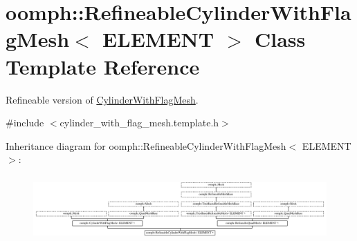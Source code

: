 \hypertarget{classoomph_1_1RefineableCylinderWithFlagMesh}{}\section{oomph\+:\+:Refineable\+Cylinder\+With\+Flag\+Mesh$<$ E\+L\+E\+M\+E\+NT $>$ Class Template Reference}
\label{classoomph_1_1RefineableCylinderWithFlagMesh}


Refineable version of \hyperlink{classoomph_1_1CylinderWithFlagMesh}{Cylinder\+With\+Flag\+Mesh}.  




{\ttfamily \#include $<$cylinder\+\_\+with\+\_\+flag\+\_\+mesh.\+template.\+h$>$}

Inheritance diagram for oomph\+:\+:Refineable\+Cylinder\+With\+Flag\+Mesh$<$ E\+L\+E\+M\+E\+NT $>$\+:\begin{figure}[H]
\begin{center}
\leavevmode
\includegraphics[height=2.522523cm]{classoomph_1_1RefineableCylinderWithFlagMesh}
\end{center}
\end{figure}
